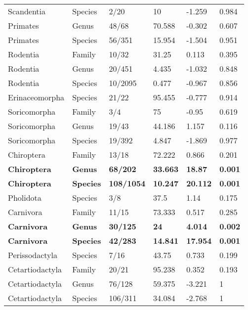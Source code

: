 \begin{longtable}{llllll}
  Scandentia & Species & 2/20 & 10 & -1.259 & 0.984 \\ 
  Primates & Genus & 48/68 & 70.588 & -0.302 & 0.607 \\ 
  Primates & Species & 56/351 & 15.954 & -1.504 & 0.951 \\ 
  Rodentia & Family & 10/32 & 31.25 & 0.113 & 0.395 \\ 
  Rodentia & Genus & 20/451 & 4.435 & -1.032 & 0.848 \\ 
  Rodentia & Species & 10/2095 & 0.477 & -0.967 & 0.856 \\ 
  Erinaceomorpha & Species & 21/22 & 95.455 & -0.777 & 0.914 \\ 
  Soricomorpha & Family & 3/4 & 75 & -0.95 & 0.619 \\ 
  Soricomorpha & Genus & 19/43 & 44.186 & 1.157 & 0.116 \\ 
  Soricomorpha & Species & 19/392 & 4.847 & -1.869 & 0.977 \\ 
  Chiroptera & Family & 13/18 & 72.222 & 0.866 & 0.201 \\ 
  \textbf{Chiroptera} & \textbf{Genus} & \textbf{68/202} & \textbf{33.663} & \textbf{18.87} & \textbf{0.001} \\ 
  \textbf{Chiroptera} & \textbf{Species} & \textbf{108/1054} & \textbf{10.247} & \textbf{20.112} & \textbf{0.001} \\ 
  Pholidota & Species & 3/8 & 37.5 & 1.14 & 0.175 \\ 
  Carnivora & Family & 11/15 & 73.333 & 0.517 & 0.285 \\ 
  \textbf{Carnivora} & \textbf{Genus} & \textbf{30/125} & \textbf{24} & \textbf{4.014} & \textbf{0.002} \\ 
  \textbf{Carnivora} & \textbf{Species} & \textbf{42/283} & \textbf{14.841} & \textbf{17.954} & \textbf{0.001} \\ 
  Perissodactyla & Species & 7/16 & 43.75 & 0.733 & 0.199 \\ 
  Cetartiodactyla & Family & 20/21 & 95.238 & 0.352 & 0.193 \\ 
  Cetartiodactyla & Genus & 76/128 & 59.375 & -3.221 & 1 \\ 
  Cetartiodactyla & Species & 106/311 & 34.084 & -2.768 & 1 \\ 
   \hline
\hline
\end{longtable}
